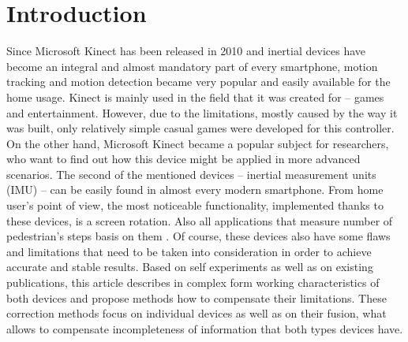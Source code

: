 \documentclass{llncs}
\begin{document}
\section{Introduction}
Since Microsoft Kinect has been released in 2010 and inertial devices have become an integral and almost mandatory part of every smartphone, motion tracking and motion detection became very popular and easily available for the home usage. Kinect is mainly used in the field that it was created for -- games and entertainment. However, due to the limitations, mostly caused by the way it was built, only relatively simple casual games were developed for this controller. On the other hand, Microsoft Kinect became a popular subject for researchers, who want to find out how this device might be applied in more advanced scenarios. 
The second of the mentioned devices -- inertial measurement units (IMU) -- can be easily found in almost every modern smartphone. From home user's point of view, the most noticeable functionality, implemented thanks to these devices, is a screen rotation. Also all applications that measure number of pedestrian's steps basis on them \cite{Jayalath2013,walklogger}. Of course, these devices also have some flaws and limitations that need to be taken into consideration in order to achieve accurate and stable results.
Based on self experiments as well as on existing publications, this article describes in complex form  working characteristics of both devices and propose methods how to compensate their limitations. These correction methods focus on individual devices as well as on their fusion, what allows to compensate incompleteness of information that both types devices have.
	
\end{document}
